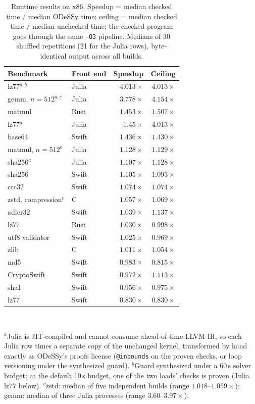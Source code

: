 \documentclass[acmsmall,screen,nonacm]{acmart}
\newcommand{\odessy}{ODeSSy}
\newcommand{\tool}{\odessy}
\begin{document}
\begin{table}
\caption{Runtime results on x86. Speedup = median checked time / median
\tool{} time; ceiling = median checked time / median unchecked time; the
checked program goes through the same \texttt{-O3} pipeline. Medians of 30
shuffled repetitions (21 for the Julia rows), byte-identical output across
all builds.}
\label{tab:speedups}
\small
\begin{tabular}{llrr}
\toprule
Benchmark & Front end & Speedup & Ceiling\\
\midrule
lz77$^{a,b}$ & Julia & $\mathbf{4.013\times}$ & $4.013\times$\\
gemm, $n{=}512^{a,c}$ & Julia & $\mathbf{3.778\times}$ & $4.154\times$\\
matmul & Rust & $\mathbf{1.453\times}$ & $1.507\times$\\
lz77$^{a}$ & Julia & $\mathbf{1.45\times}$ & $4.013\times$\\
base64 & Swift & $\mathbf{1.436\times}$ & $1.430\times$\\
matmul, $n{=}512^{a}$ & Julia & $\mathbf{1.128\times}$ & $1.129\times$\\
sha256$^{a}$ & Julia & $\mathbf{1.107\times}$ & $1.128\times$\\
sha256 & Swift & $\mathbf{1.105\times}$ & $1.093\times$\\
crc32 & Swift & $\mathbf{1.074\times}$ & $1.074\times$\\
zstd, compression$^{c}$ & C & $\mathbf{1.057\times}$ & $1.069\times$\\
adler32 & Swift & $\mathbf{1.039\times}$ & $1.137\times$\\
lz77 & Rust & $\mathbf{1.030\times}$ & $0.998\times$\\
utf8 validator & Swift & $\mathbf{1.025\times}$ & $0.969\times$\\
zlib & C & $\mathbf{1.011\times}$ & $1.054\times$\\
\midrule
md5 & Swift & $\mathbf{0.983\times}$ & $0.815\times$\\
CryptoSwift & Swift & $\mathbf{0.972\times}$ & $1.113\times$\\
sha1 & Swift & $\mathbf{0.956\times}$ & $0.975\times$\\
lz77 & Swift & $\mathbf{0.830\times}$ & $0.830\times$\\
\bottomrule
\end{tabular}\\
\raggedright\footnotesize
$^{a}$Julia is JIT-compiled and cannot consume ahead-of-time LLVM IR, so
each Julia row times a separate copy of the unchanged kernel, transformed
by hand exactly as \tool{}'s proofs license (\texttt{@inbounds} on the
proven checks, or loop versioning under the synthesized guard).
$^{b}$Guard synthesized under a 60\,s solver budget; at the default
10\,s budget, one of the two loads' checks is proven (Julia lz77 below).
$^{c}$zstd: median of five independent builds (range
$1.018$--$1.059\times$); gemm: median of three Julia processes (range
$3.60$--$3.97\times$).\par
\end{table}
\end{document}

